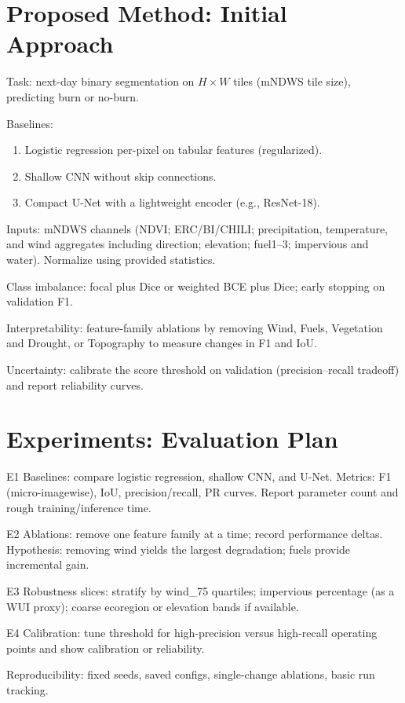 \documentclass[conference]{IEEEtran}
\begin{document}
\section{Proposed Method: Initial Approach}
Task: next-day binary segmentation on $H\times W$ tiles (mNDWS tile size), predicting burn or no-burn.

Baselines:
\begin{enumerate}
    \item Logistic regression per-pixel on tabular features (regularized).
    \item Shallow CNN without skip connections.
    \item Compact U-Net with a lightweight encoder (e.g., ResNet-18).
\end{enumerate}

Inputs: mNDWS channels (NDVI; ERC/BI/CHILI; precipitation, temperature, and wind aggregates including direction; elevation; fuel1--3; impervious and water). Normalize using provided statistics.

Class imbalance: focal plus Dice or weighted BCE plus Dice; early stopping on validation F1.

Interpretability: feature-family ablations by removing Wind, Fuels, Vegetation and Drought, or Topography to measure changes in F1 and IoU.

Uncertainty: calibrate the score threshold on validation (precision–recall tradeoff) and report reliability curves.

\section{Experiments: Evaluation Plan}
E1 Baselines: compare logistic regression, shallow CNN, and U-Net. Metrics: F1 (micro-imagewise), IoU, precision/recall, PR curves. Report parameter count and rough training/inference time.

E2 Ablations: remove one feature family at a time; record performance deltas. Hypothesis: removing wind yields the largest degradation; fuels provide incremental gain.

E3 Robustness slices: stratify by wind\_75 quartiles; impervious percentage (as a WUI proxy); coarse ecoregion or elevation bands if available.

E4 Calibration: tune threshold for high-precision versus high-recall operating points and show calibration or reliability.

Reproducibility: fixed seeds, saved configs, single-change ablations, basic run tracking.
\end{document}
